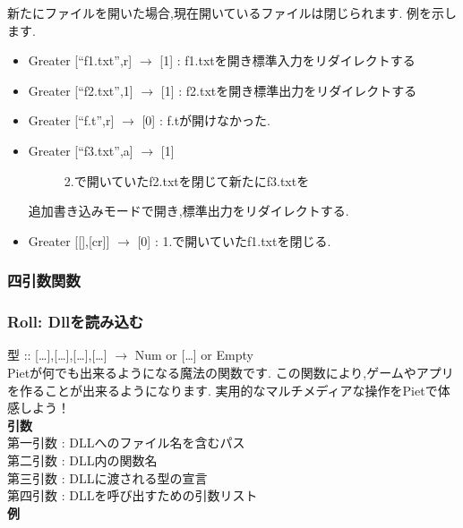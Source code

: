 新たにファイルを開いた場合,現在開いているファイルは閉じられます.
例を示します.

\begin{itemize}
\item
  Greater {[}``f1.txt'',r{]} $\to$ {[}1{]} :
  f1.txtを開き標準入力をリダイレクトする
\item
  Greater {[}``f2.txt'',1{]} $\to$ {[}1{]} :
  f2.txtを開き標準出力をリダイレクトする
\item
  Greater {[}``f.t'',r{]} $\to$ {[}0{]} : f.tが開けなかった.
\item
  \begin{description}
  \item[Greater {[}``f3.txt'',a{]} $\to$ {[}1{]}]
  2.で開いていたf2.txtを閉じて新たにf3.txtを
  \end{description}

  追加書き込みモードで開き,標準出力をリダイレクトする.
\item
  Greater {[}{[}{]},{[}cr{]}{]} $\to$ {[}0{]} :
  1.で開いていたf1.txtを閉じる.
\end{itemize}

\subsubsection{四引数関数}

\subsubsection{Roll: Dllを読み込む}

型 :: {[}\ldots{}{]},{[}\ldots{}{]},{[}\ldots{}{]},{[}\ldots{}{]}
$\to$ Num or {[}\ldots{}{]} or
Empty\\Pietが何でも出来るようになる魔法の関数です.
この関数により,ゲームやアプリを作ることが出来るようになります.
実用的なマルチメディアな操作をPietで体感しよう！\\\textbf{引数}\\第一引数
: DLLへのファイル名を含むパス\\第二引数 : DLL内の関数名\\第三引数 :
DLLに渡される型の宣言\\第四引数 :
DLLを呼び出すための引数リスト\\\textbf{例}

